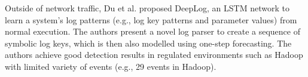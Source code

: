 \documentclass[a4paper,12pt,twoside]{article}
\begin{document}
Outside of network traffic, Du et al. \cite{du2017deeplog} proposed DeepLog, an LSTM network to learn a system's log patterns (e.g., log key patterns and parameter values) from normal execution. The authors present a novel log parser to create a sequence of symbolic log keys, which is then also modelled using one-step forecasting. %
The authors achieve good detection results in regulated environments such as Hadoop with limited variety of events (e.g., 29 events in Hadoop).%


\end{document}
